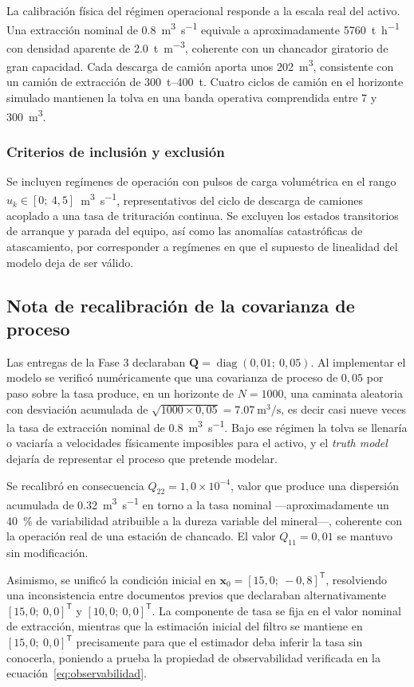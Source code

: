 La calibración física del régimen operacional responde a la escala real del
activo. Una extracción nominal de \SI{0,8}{\metre\cubed\per\second} equivale a
aproximadamente \SI{5760}{\tonne\per\hour} con densidad aparente de
\SI{2,0}{\tonne\per\metre\cubed}, coherente con un chancador giratorio de gran
capacidad. Cada descarga de camión aporta unos \SI{202}{\metre\cubed},
consistente con un camión de extracción de \SIrange{300}{400}{\tonne}. Cuatro
ciclos de camión en el horizonte simulado mantienen la tolva en una banda
operativa comprendida entre \num{7} y \SI{300}{\metre\cubed}.

\subsubsection*{Criterios de inclusión y exclusión}

Se incluyen regímenes de operación con pulsos de carga volumétrica en el rango
$u_{k} \in [0;\ 4{,}5]$~\si{\metre\cubed\per\second}, representativos del ciclo
de descarga de camiones acoplado a una tasa de trituración continua. Se excluyen
los estados transitorios de arranque y parada del equipo, así como las anomalías
catastróficas de atascamiento, por corresponder a regímenes en que el supuesto
de linealidad del modelo deja de ser válido.

\subsection{Nota de recalibración de la covarianza de proceso}
\label{sec:recalibracion}

Las entregas de la Fase 3 declaraban $\mathbf{Q} = \operatorname{diag}(0{,}01;\
0{,}05)$. Al implementar el modelo se verificó numéricamente que una covarianza
de proceso de $0{,}05$ por paso sobre la tasa produce, en un horizonte de $N =
1000$, una caminata aleatoria con desviación acumulada de
$\sqrt{1000 \times 0{,}05} = \SI{7,07}{\metre\cubed\per\second}$, es decir casi
nueve veces la tasa de extracción nominal de
\SI{0,8}{\metre\cubed\per\second}. Bajo ese régimen la tolva se llenaría o
vaciaría a velocidades físicamente imposibles para el activo, y el
\emph{truth model} dejaría de representar el proceso que pretende modelar.

Se recalibró en consecuencia $Q_{22} = 1{,}0\times10^{-4}$, valor que produce
una dispersión acumulada de \SI{0,32}{\metre\cubed\per\second} en torno a la
tasa nominal —aproximadamente un \SI{40}{\percent} de variabilidad atribuible a
la dureza variable del mineral—, coherente con la operación real de una estación
de chancado. El valor $Q_{11} = 0{,}01$ se mantuvo sin modificación.

Asimismo, se unificó la condición inicial en
$\mathbf{x}_{0} = [15{,}0;\ -0{,}8]^{\mathsf{T}}$, resolviendo una
inconsistencia entre documentos previos que declaraban alternativamente
$[15{,}0;\ 0{,}0]^{\mathsf{T}}$ y $[10{,}0;\ 0{,}0]^{\mathsf{T}}$. La
componente de tasa se fija en el valor nominal de extracción, mientras que la
estimación inicial del filtro se mantiene en $[15{,}0;\ 0{,}0]^{\mathsf{T}}$
precisamente para que el estimador deba inferir la tasa sin conocerla, poniendo
a prueba la propiedad de observabilidad verificada en la
ecuación~\eqref{eq:observabilidad}.
